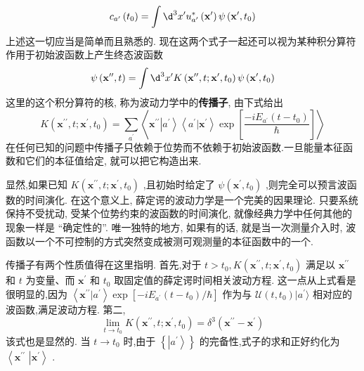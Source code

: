 \begin{equation}
{c}_{{a}^{\prime }}\left( {t}_{0}\right) = \int {\d}^{3}{x}^{\prime }{u}_{{a}^{\prime }}^{ * }\left( {\mathbf{x}}^{\prime }\right) \psi \left( {{\mathbf{x}}^{\prime },{t}_{0}}\right)
\end{equation}
上述这一切应当是简单而且熟悉的. 现在这两个式子一起还可以视为某种积分算符作用于初始波函数上产生终态波函数
\begin{equation}
\psi \left( {{\mathbf{x}}^{\prime \prime }, t}\right) = \int {\d}^{3}{x}^{\prime }K\left( {{\mathbf{x}}^{\prime \prime }, t;{\mathbf{x}}^{\prime },{t}_{0}}\right) \psi \left( {{\mathbf{x}}^{\prime },{t}_{0}}\right)
\end{equation}
这里的这个积分算符的核, 称为波动力学中的\textbf{传播子}, 由下式给出
\begin{equation}
K\left( {{\mathbf{x}}^{\prime \prime }, t;{\mathbf{x}}^{\prime },{t}_{0}}\right) = \mathop{\sum }\limits_{{a}^{\prime }}\left\langle {{\mathbf{x}}^{\prime \prime }\left| {a}^{\prime }\right\rangle \left\langle {{a}^{\prime } | {\mathbf{x}}^{\prime }}\right\rangle \exp \left\lbrack \frac{-i{E}_{{a}^{\prime }}\left( {t - {t}_{0}}\right) }{\hbar }\right\rbrack }\right\rangle
\end{equation}
在任何已知的问题中传播子只依赖于位势而不依赖于初始波函数.一旦能量本征函数和它们的本征值给定, 就可以把它构造出来.

显然,如果已知 $K\left( {{\mathbf{x}}^{\prime \prime }, t;{\mathbf{x}}^{\prime },{t}_{0}}\right)$ ,且初始时给定了 $\psi \left( {{\mathbf{x}}^{\prime },{t}_{0}}\right)$ ,则完全可以预言波函数的时间演化. 在这个意义上, 薛定谔的波动力学是一个完美的因果理论. 只要系统保持不受扰动, 受某个位势约束的波函数的时间演化, 就像经典力学中任何其他的现象一样是 “确定性的”. 唯一独特的地方, 如果有的话, 就是当一次测量介入时, 波函数以一个不可控制的方式突然变成被测可观测量的本征函数中的一个.

传播子有两个性质值得在这里指明. 首先,对于 $t > {t}_{0}, K\left( {{\mathbf{x}}^{\prime \prime }, t;{\mathbf{x}}^{\prime },{t}_{0}}\right)$ 满足以 ${\mathbf{x}}^{\prime \prime }$ 和 $t$ 为变量、而 ${\mathbf{x}}^{\prime }$ 和 ${t}_{0}$ 取固定值的薛定谔时间相关波动方程. 这一点从上式看是很明显的,因为 $\left\langle {{\mathbf{x}}^{\prime \prime } | {a}^{\prime }}\right\rangle \exp \left\lbrack {-i{E}_{{a}^{\prime }}\left( {t - {t}_{0}}\right) /\hbar }\right\rbrack$ 作为与 $\mathcal{U}\left( {t,{t}_{0}}\right) | {a}^{\prime }\rangle$ 相对应的波函数,满足波动方程. 第二,
\begin{equation}
\mathop{\lim }\limits_{{t \rightarrow {t}_{0}}}K\left( {{\mathbf{x}}^{\prime \prime }, t;{\mathbf{x}}^{\prime },{t}_{0}}\right) = {\delta }^{3}\left( {{\mathbf{x}}^{\prime \prime } - {\mathbf{x}}^{\prime }}\right)
\end{equation}
该式也是显然的. 当 $t \rightarrow {t}_{0}$ 时,由于 $\left\{ \left| {a}^{\prime }\right\rangle \right\}$ 的完备性,式子的求和正好约化为 $\left\langle {\mathbf{x}}^{\prime \prime }\right.$ $\left| {\mathbf{x}}^{\prime }\right\rangle$ .

